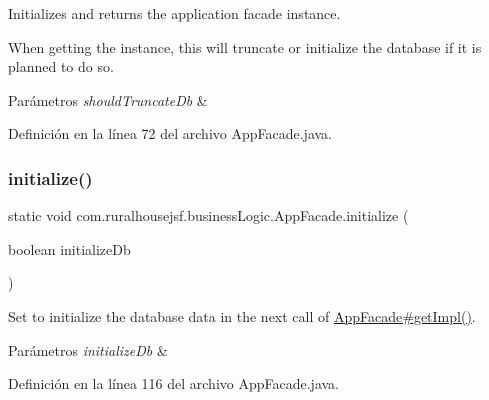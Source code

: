 Initializes and returns the application facade instance. 

When getting the instance, this will truncate or initialize the database if it is planned to do so.


\begin{DoxyParams}{Parámetros}
{\em should\+Truncate\+Db} & \\
\hline
\end{DoxyParams}


Definición en la línea 72 del archivo App\+Facade.\+java.

\mbox{\label{classcom_1_1ruralhousejsf_1_1business_logic_1_1_app_facade_a48252ec119a6bb16f5353df6ec6eff54}} 
\subsubsection{\texorpdfstring{initialize()}{initialize()}}
{\footnotesize\ttfamily static void com.\+ruralhousejsf.\+business\+Logic.\+App\+Facade.\+initialize (\begin{DoxyParamCaption}\item[{boolean}]{initialize\+Db }\end{DoxyParamCaption})\hspace{0.3cm}{\ttfamily [static]}}

Set to initialize the database data in the next call of \mbox{\hyperlink{classcom_1_1ruralhousejsf_1_1business_logic_1_1_app_facade_a029bcceee98b9070b9f80abc54db45d6}{App\+Facade\#get\+Impl()}}.


\begin{DoxyParams}{Parámetros}
{\em initialize\+Db} & \\
\hline
\end{DoxyParams}


Definición en la línea 116 del archivo App\+Facade.\+java.

\mbox{\label{classcom_1_1ruralhousejsf_1_1business_logic_1_1_app_facade_a0486115e3ba238d025e23ec62548b3bc}} 
